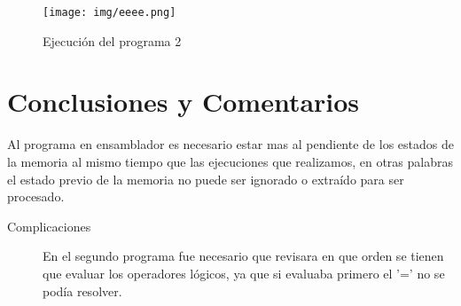 \documentclass[12pt]{article}
\begin{document}
\begin{figure}[htbp]
\centering
\texttt{[image: img/eeee.png]}
\caption{Ejecución del programa 2}
\end{figure}
\pagebreak


\section{Conclusiones y Comentarios}
\label{sec:orgad9517e}
Al programa en ensamblador es necesario estar mas al pendiente de los estados de la memoria al mismo tiempo que las ejecuciones que realizamos, en otras palabras el estado previo de la memoria no puede ser ignorado o extraído para ser procesado.

\begin{description}
\item[{Complicaciones}] En el segundo programa fue necesario que revisara en que orden se tienen que evaluar los operadores  lógicos, ya que si evaluaba primero el '=' no se podía resolver.
\end{description}
\end{document}
